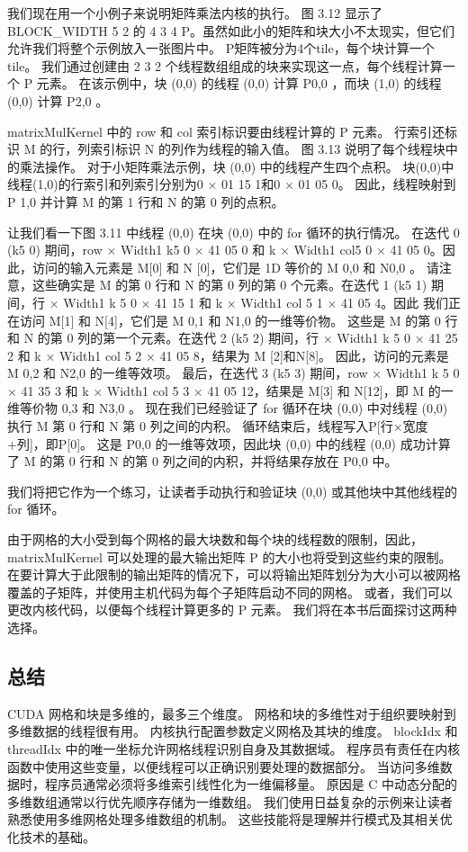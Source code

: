 我们现在用一个小例子来说明矩阵乘法内核的执行。 图 3.12 显示了 BLOCK\_WIDTH 5 2 的 4 3 4 P。虽然如此小的矩阵和块大小不太现实，但它们允许我们将整个示例放入一张图片中。 P矩阵被分为4个tile，每个块计算一个tile。 我们通过创建由 2 3 2 个线程数组组成的块来实现这一点，每个线程计算一个 P 元素。 在该示例中，块 (0,0) 的线程 (0,0) 计算 P0,0 ，而块 (1,0) 的线程 (0,0) 计算 P2,0 。

matrixMulKernel 中的 row 和 col 索引标识要由线程计算的 P 元素。 行索引还标识 M 的行，列索引标识 N 的列作为线程的输入值。 图 3.13 说明了每个线程块中的乘法操作。 对于小矩阵乘法示例，块 (0,0) 中的线程产生四个点积。 块(0,0)中线程(1,0)的行索引和列索引分别为0 × 01 15 1和0 × 01 05 0。 因此，线程映射到 P 1,0 并计算 M 的第 1 行和 N 的第 0 列的点积。

让我们看一下图 3.11 中线程 (0,0) 在块 (0,0) 中的 for 循环的执行情况。 在迭代 0 (k5 0) 期间，row × Width1 k5 0 × 41 05 0 和 k × Width1 col5 0 × 41 05 0。因此，访问的输入元素是 M[0] 和 N [0]，它们是 1D 等价的 M 0,0 和 N0,0 。 请注意，这些确实是 M 的第 0 行和 N 的第 0 列的第 0 个元素。在迭代 1 (k5 1) 期间，行 × Width1 k 5 0 × 41 15 1 和 k × Width1 col 5 1 × 41 05 4。因此 我们正在访问 M[1] 和 N[4]，它们是 M 0,1 和 N1,0 的一维等价物。 这些是 M 的第 0 行和 N 的第 0 列的第一个元素。在迭代 2 (k5 2) 期间，行 × Width1 k 5 0 × 41 25 2 和 k × Width1 col 5 2 × 41 05 8，结果为 M [2]和N[8]。 因此，访问的元素是 M 0,2 和 N2,0 的一维等效项。 最后，在迭代 3 (k5 3) 期间，row × Width1 k 5 0 × 41 35 3 和 k × Width1 col 5 3 × 41 05 12，结果是 M[3] 和 N[12]，即 M 的一维等价物 0,3 和 N3,0 。 现在我们已经验证了 for 循环在块 (0,0) 中对线程 (0,0) 执行 M 第 0 行和 N 第 0 列之间的内积。 循环结束后，线程写入P[行×宽度+列]，即P[0]。 这是 P0,0 的一维等效项，因此块 (0,0) 中的线程 (0,0) 成功计算了 M 的第 0 行和 N 的第 0 列之间的内积，并将结果存放在 P0,0 中。

我们将把它作为一个练习，让读者手动执行和验证块 (0,0) 或其他块中其他线程的 for 循环。

由于网格的大小受到每个网格的最大块数和每个块的线程数的限制，因此，matrixMulKernel 可以处理的最大输出矩阵 P 的大小也将受到这些约束的限制。 在要计算大于此限制的输出矩阵的情况下，可以将输出矩阵划分为大小可以被网格覆盖的子矩阵，并使用主机代码为每个子矩阵启动不同的网格。 或者，我们可以更改内核代码，以便每个线程计算更多的 P 元素。 我们将在本书后面探讨这两种选择。

\subsection{总结}
CUDA 网格和块是多维的，最多三个维度。 网格和块的多维性对于组织要映射到多维数据的线程很有用。 内核执行配置参数定义网格及其块的维度。 blockIdx 和 threadIdx 中的唯一坐标允许网格线程识别自身及其数据域。 程序员有责任在内核函数中使用这些变量，以便线程可以正确识别要处理的数据部分。 当访问多维数据时，程序员通常必须将多维索引线性化为一维偏移量。 原因是 C 中动态分配的多维数组通常以行优先顺序存储为一维数组。 我们使用日益复杂的示例来让读者熟悉使用多维网格处理多维数组的机制。 这些技能将是理解并行模式及其相关优化技术的基础。



